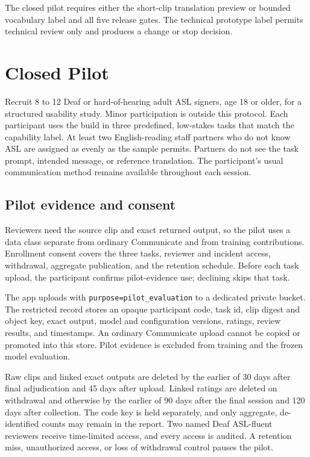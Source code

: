 \documentclass[11pt]{article}
\newcommand{\code}[1]{\texttt{#1}}
\begin{document}
The closed pilot requires either the short-clip translation preview or bounded
vocabulary label and all five release gates. The technical prototype label permits
technical review only and produces a change or stop decision.

\section{Closed Pilot}

Recruit 8 to 12 Deaf or hard-of-hearing adult ASL signers, age 18 or older, for a
structured usability study. Minor participation is outside this protocol.
Each participant uses the build in three predefined, low-stakes tasks that match the
capability label. At least two English-reading staff partners who do not know ASL are
assigned as evenly as the sample permits. Partners do not see the task prompt,
intended message, or reference translation. The participant's usual communication
method remains available throughout each session.

\subsection{Pilot evidence and consent}
\label{sec:pilotdata}

Reviewers need the source clip and exact returned output, so the pilot uses a data
class separate from ordinary Communicate and from training contributions. Enrollment
consent covers the three tasks, reviewer and incident access, withdrawal, aggregate
publication, and the retention schedule. Before each task upload, the participant
confirms pilot-evidence use; declining skips that task.

The app uploads with \code{purpose=pilot\_evaluation} to a dedicated private bucket.
The restricted record stores an opaque participant code, task id, clip digest and
object key, exact output, model and configuration versions, ratings, review results,
and timestamps. An ordinary Communicate upload cannot be copied or promoted into this
store. Pilot evidence is excluded from training and the frozen model evaluation.

Raw clips and linked exact outputs are deleted by the earlier of 30 days after final
adjudication and 45 days after upload. Linked ratings are deleted on withdrawal and
otherwise by the earlier of 90 days after the final session and 120 days after
collection. The code key is held separately, and only aggregate, de-identified counts
may remain in the report. Two named Deaf ASL-fluent reviewers
receive time-limited access, and every access is audited. A retention miss,
unauthorized access, or loss of withdrawal control pauses the pilot.
\end{document}
